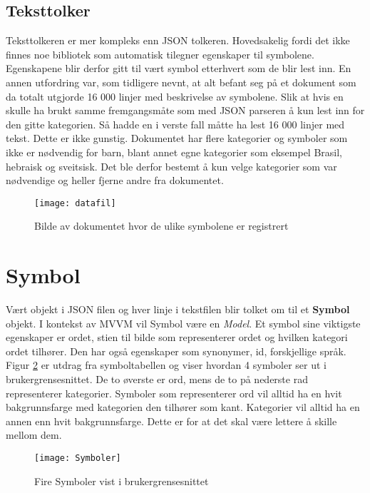 \subsection{Teksttolker}

Teksttolkeren er mer kompleks enn JSON tolkeren. Hovedsakelig fordi det ikke finnes noe bibliotek som automatisk tilegner egenskaper til symbolene. Egenskapene blir derfor gitt til vært symbol etterhvert som de blir lest inn. En annen utfordring var, som tidligere nevnt, at alt befant seg på et dokument som da totalt utgjorde 16 000 linjer med beskrivelse av symbolene. Slik at hvis en skulle ha brukt samme fremgangsmåte som med JSON parseren å kun lest inn for den gitte kategorien. Så hadde en i verste fall måtte ha lest 16 000 linjer med tekst. Dette er ikke gunstig. Dokumentet har flere kategorier og symboler som ikke er nødvendig for barn, blant annet egne kategorier som eksempel Brasil, hebraisk og sveitsisk. Det ble derfor bestemt å kun velge kategorier som var nødvendige og heller fjerne andre fra dokumentet.

\begin{figure}[ht!] 
\centering 
\texttt{[image: datafil]} 
\caption{Bilde av dokumentet hvor de ulike symbolene er registrert} 
\label{fig:dok} 
\end{figure} 


\section{Symbol}

Vært objekt i JSON filen og hver linje i tekstfilen blir tolket om til et \textbf{Symbol} objekt. I kontekst av MVVM vil Symbol være en \textit{Model}. Et symbol sine viktigste egenskaper er ordet, stien til bilde som representerer ordet og hvilken kategori ordet tilhører. Den har også egenskaper som synonymer, id, forskjellige språk. Figur \ref{fig:symb} er utdrag fra symboltabellen og viser hvordan 4 symboler ser ut i brukergrensesnittet. De to øverste er ord, mens de to på nederste rad representerer kategorier. Symboler som representerer ord vil alltid ha en hvit bakgrunnsfarge med kategorien den tilhører som kant. Kategorier vil alltid ha en annen enn hvit bakgrunnsfarge. Dette er for at det skal være lettere å skille mellom dem.

 \begin{figure}[ht!] 
\centering 
\texttt{[image: Symboler]} 
\caption{Fire Symboler vist i brukergrensesnittet} 
\label{fig:symb} 
\end{figure} 

